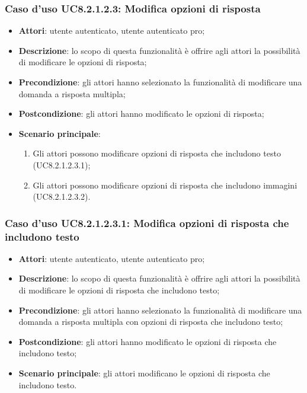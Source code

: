 \subsubsection{Caso d'uso UC8.2.1.2.3: Modifica opzioni di risposta}
	\begin{itemize}
		\item
			\textbf{Attori}: utente autenticato, utente autenticato pro;
		\item		
			\textbf{Descrizione}: lo scopo di questa funzionalità è offrire agli attori la possibilità di modificare le opzioni di risposta;
		\item
			\textbf{Precondizione}: gli attori hanno selezionato la funzionalità di modificare una domanda a risposta multipla; 
		\item
			\textbf{Postcondizione}: gli attori hanno modificato le opzioni di risposta;
		\item
			\textbf{Scenario principale}:
	       		\begin{enumerate}
	       			\item
	       			Gli attori possono modificare opzioni di risposta che includono testo (UC8.2.1.2.3.1);
					\item
					Gli attori possono modificare opzioni di risposta che includono immagini (UC8.2.1.2.3.2).
	 			\end{enumerate}
	\end{itemize}	
	
\subsubsection{Caso d'uso UC8.2.1.2.3.1: Modifica opzioni di risposta che includono testo}
	\begin{itemize}
		\item
			\textbf{Attori}: utente autenticato, utente autenticato pro;
		\item		
			\textbf{Descrizione}: lo scopo di questa funzionalità è offrire agli attori la possibilità di modificare le opzioni di risposta che includono testo;
		\item
			\textbf{Precondizione}: gli attori hanno selezionato la funzionalità di modificare una domanda a risposta multipla con opzioni di risposta che includono testo; 
		\item
			\textbf{Postcondizione}: gli attori hanno modificato le opzioni di risposta che includono testo;
		\item
			\textbf{Scenario principale}: gli attori modificano le opzioni di risposta che includono testo. 			
	\end{itemize}	
	
